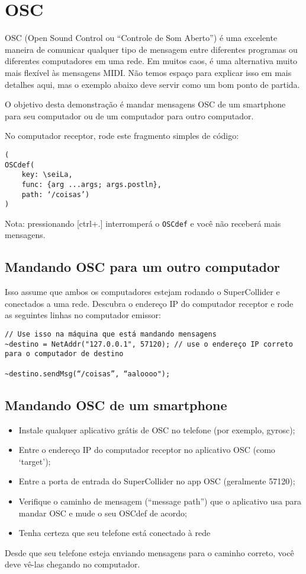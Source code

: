 \section{OSC}

OSC (Open Sound Control ou “Controle de Som Aberto”) é uma excelente maneira de comunicar qualquer tipo de mensagem entre diferentes programas ou diferentes computadores em uma rede. Em muitos caos, é uma alternativa muito mais flexível às mensagens MIDI. Não temos espaço para explicar isso em mais detalhes aqui, mas o exemplo abaixo deve servir como um bom ponto de partida.

O objetivo desta demonstração é mandar mensagens OSC de um smartphone para seu computador ou de um computador para outro computador.

No computador receptor, rode este fragmento simples de código:

\bigskip
\begin{lstlisting}[style=SuperCollider-IDE, basicstyle=\scttfamily\footnotesize]
(
OSCdef(
	key: \seiLa,
	func: {arg ...args; args.postln},
	path: ‘/coisas’)
)
\end{lstlisting}

Nota: pressionando [ctrl+.] interromperá o \texttt{OSCdef} e você não receberá mais mensagens.

\subsection{Mandando OSC para um outro computador}

Isso assume que ambos os computadores estejam rodando o SuperCollider e conectados a uma rede. Descubra o endereço IP do computador receptor e rode as seguintes linhas no computador emissor:

\begin{lstlisting}[style=SuperCollider-IDE, basicstyle=\scttfamily\footnotesize]
// Use isso na máquina que está mandando mensagens
~destino = NetAddr("127.0.0.1", 57120); // use o endereço IP correto para o computador de destino

~destino.sendMsg(“/coisas”, “aaloooo");
\end{lstlisting}

\subsection{Mandando OSC de um smartphone}

\begin{itemize}
\item Instale qualquer aplicativo grátis de OSC no telefone (por exemplo, gyrosc);
\item Entre o endereço IP do computador receptor no aplicativo OSC (como ‘target’);
\item Entre a porta de entrada do SuperCollider no app OSC (geralmente 57120);
\item Verifique o caminho de mensagem (“message path”) que o aplicativo usa para mandar OSC e mude o seu OSCdef de acordo;
\item Tenha certeza que seu telefone está conectado à rede
\end{itemize}

Desde que seu telefone esteja enviando mensagens para o caminho correto, você deve vê-las chegando no computador.
